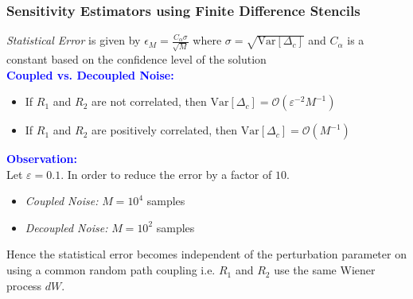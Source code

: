 \documentclass[a4paper,10pt]{beamer}
\newcommand{\sqb}[1]{\left[ #1 \right]}
\newcommand{\rb}[1]{\left( #1 \right)}
\begin{document}
	\begin{frame}
		\frametitle{\large Sensitivity Estimators using Finite Difference Stencils}
		\textit{Statistical Error} is given by $\epsilon_{M} = \frac{C_{\alpha} \sigma}{\sqrt{M}}$ where $\sigma = \sqrt{\text{Var}\sqb{\Delta_{c}}}$ and $C_{\alpha}$ is a constant based on the confidence level of the solution \\
		\vspace{0.15cm}
		\textcolor{blue}{\textbf{Coupled vs. Decoupled Noise:}}
		\begin{itemize}
			\item {If $R_{1}$ and $R_{2}$ are not correlated, then $\text{Var}\sqb{\Delta_{c}} = \mathcal{O}\rb{\varepsilon^{-2} M^{-1}}$}
			\item {If $R_{1}$ and $R_{2}$ are positively correlated, then $\text{Var}\sqb{\Delta_{c}} = \mathcal{O}\rb{M^{-1}}$}
		\end{itemize}
		\textcolor{blue}{\textbf{Observation:}} \\
		Let $\varepsilon = 0.1$. In order to reduce the error by a factor of $10$.
		\begin{itemize}
			\item {\textit{Coupled Noise:} $M = 10^{4}$ samples}
			\item {\textit{Decoupled Noise:} $M = 10^{2}$ samples}
		\end{itemize}
		Hence the statistical error becomes independent of the perturbation parameter on using a common random path coupling i.e. $R_{1}$ and $R_{2}$ use the same Wiener process $dW$.
	\end{frame}
\end{document}
